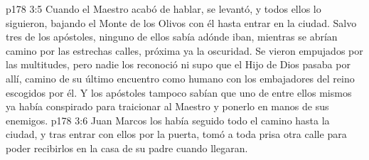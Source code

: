 \vs p178 3:5 \pc Cuando el Maestro acabó de hablar, se levantó, y todos ellos lo siguieron, bajando el Monte de los Olivos con él hasta entrar en la ciudad. Salvo tres de los apóstoles, ninguno de ellos sabía adónde iban, mientras se abrían camino por las estrechas calles, próxima ya la oscuridad. Se vieron empujados por las multitudes, pero nadie los reconoció ni supo que el Hijo de Dios pasaba por allí, camino de su último encuentro como humano con los embajadores del reino escogidos por él. Y los apóstoles tampoco sabían que uno de entre ellos mismos ya había conspirado para traicionar al Maestro y ponerlo en manos de sus enemigos.
\vs p178 3:6 Juan Marcos los había seguido todo el camino hasta la ciudad, y tras entrar con ellos por la puerta, tomó a toda prisa otra calle para poder recibirlos en la casa de su padre cuando llegaran.
